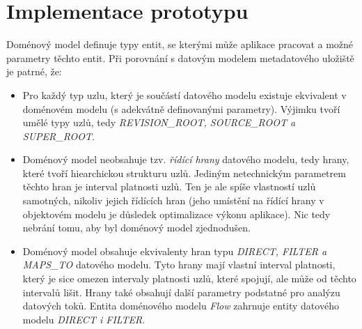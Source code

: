 \chapter{Implementace prototypu}

Doménový model definuje typy entit, se kterými může aplikace pracovat a možné parametry těchto entit. Při porovnání s datovým modelem metadatového uložiště je patrné, že:

\begin{itemize}
   \item{} Pro každý typ uzlu, který je součástí datového modelu existuje ekvivalent v doménovém modelu (s adekvátně definovanými parametry). Výjimku tvoří umělé typy uzlů, tedy \textit{REVISION\_ROOT, SOURCE\_ROOT a SUPER\_ROOT}.
   \item{} Doménový model neobsahuje tzv. \textit{řídící hrany} datového modelu, tedy hrany, které tvoří hiearchickou strukturu uzlů. Jediným netechnickým parametrem těchto hran je interval platnosti uzlů. Ten je ale spíše vlastností uzlů samotných, nikoliv jejich řídících hran (jeho umístění na řídící hrany v objektovém modelu je důsledek optimalizace výkonu aplikace). Nic tedy nebrání tomu, aby byl doménový model zjednodušen.
   \item{} Doménový model obsahuje ekvivalenty hran typu \textit{DIRECT, FILTER a MAPS\_TO} datového modelu. Tyto hrany mají vlastní interval platnosti, který je sice omezen intervaly platnosti uzlů, které spojují, ale může od těchto intervalů lišit. Hrany také obsahují další parametry podstatné pro analýzu datových toků. Entita doménového modelu \textit{Flow} zahrnuje entity datového modelu \textit{DIRECT i FILTER}.
\end{itemize}
